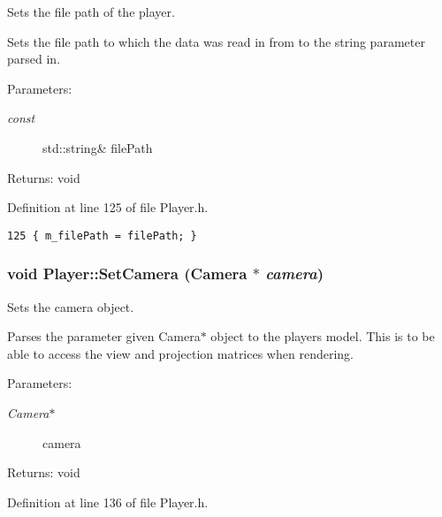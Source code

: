 Sets the file path of the player. 

Sets the file path to which the data was read in from to the string parameter parsed in.

\begin{Desc}
\item[Parameters:]
\begin{description}
\item[{\em const}]std::string\& filePath \end{description}
\end{Desc}
\begin{Desc}
\item[Returns:]void \end{Desc}


Definition at line 125 of file Player.h.

\begin{Code}\begin{verbatim}125 { m_filePath = filePath; }
\end{verbatim}
\end{Code}


\hypertarget{class_player_4747c299dc385f1aeb6ade65d67962bf}{
\subsubsection[SetCamera]{\setlength{\rightskip}{0pt plus 5cm}void Player::SetCamera ({\bf Camera} $\ast$ {\em camera})}}
\label{class_player_4747c299dc385f1aeb6ade65d67962bf}


Sets the camera object. 

Parses the parameter given Camera$\ast$ object to the players model. This is to be able to access the view and projection matrices when rendering.

\begin{Desc}
\item[Parameters:]
\begin{description}
\item[{\em Camera$\ast$}]camera \end{description}
\end{Desc}
\begin{Desc}
\item[Returns:]void \end{Desc}


Definition at line 136 of file Player.h.

